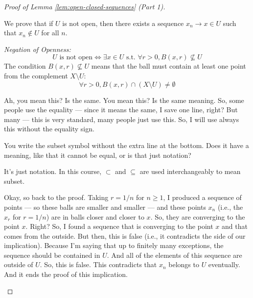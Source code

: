 \begin{proof}[Proof of Lemma \ref{lem:open-closed-sequences} (Part 1)]
\begin{math-stroke}[Backward Implication \texorpdfstring{$\impliedby$}{<=} (via Contraposition)]
We prove that if $U$ is not open, then there exists a sequence $x_n \to x \in U$ such that $x_n \notin U$ for all $n$.
        
\emph{Negation of Openness:}
\[ U \text{ is not open} \iff \exists x \in U \text{ s.t. } \forall r > 0, B(x, r) \not\subseteq U \]
The condition $B(x, r) \not\subseteq U$ means that the ball must contain at least one point from the complement $X \setminus U$:
\[ \forall r > 0, B(x, r) \cap (X \setminus U) \neq \emptyset \]
\end{math-stroke}

\begin{spoken-clean}[00:18:16 - 00:19:15]
 Ah, you mean this?  Is the same. You mean this?  Is the same meaning. So, some people use the equality --- since it means the same, I save one line, right? But many --- this is very standard, many people just use this. So, I will use always this  without the equality sign.
\end{spoken-clean}

\begin{student-interaction}
You write the subset symbol without the extra line at the bottom. Does it have a meaning, like that it cannot be equal, or is that just notation?
\end{student-interaction}

\begin{spoken-clean}[continued]
It's just notation. In this course, $\subset$ and $\subseteq$ are used interchangeably to mean subset.
\end{spoken-clean}

\begin{spoken-clean}[00:19:15 - 00:21:15]
Okay, so back to the proof. Taking $r = 1/n$ for $n \ge 1$, I produced a sequence of points --- so these balls are smaller and smaller --- and these points $x_n$ (i.e., the $x_r$ for $r = 1/n$) are in balls closer and closer to $x$. So, they are converging to the point $x$. Right? So, I found a sequence that is converging to the point $x$ and that comes from the outside. But then, this is false (i.e., it contradicts the  side of our implication). Because I'm saying that up to finitely many exceptions, the sequence should be contained in $U$. And all of the elements of this sequence are outside of $U$. So, this is false. This contradicts that $x_n$ belongs to $U$ eventually. And it ends the proof of this implication.
\end{spoken-clean}


\end{proof}
